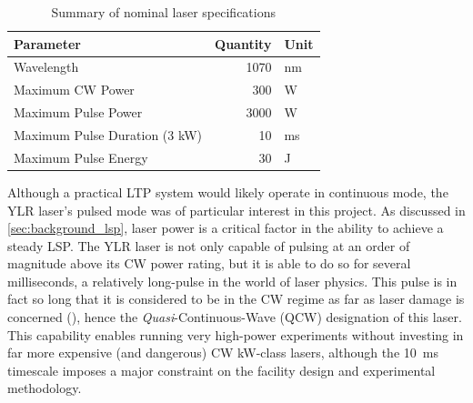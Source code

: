             \begin{table}[h]
                \centering
                \caption{Summary of nominal laser specifications}
                \label{tab:laser_spec}
                \begin{tabular}{@{}lrl@{}}
                    \toprule
                    Parameter            & Quantity & Unit \\ \midrule
                    Wavelength                    & 1070              & nm            \\
                    Maximum CW Power              & 300               & W             \\
                    Maximum Pulse Power           & 3000              & W             \\
                    Maximum Pulse Duration (3 kW) & 10                & ms            \\
                    Maximum Pulse Energy          & 30              & J             \\ \bottomrule
                    \end{tabular}
            \end{table}

            Although a practical LTP system would likely operate in continuous mode, the YLR laser's pulsed mode was of particular interest in this project. As discussed in \autoref{sec:background_lsp}, laser power is a critical factor in the ability to achieve a steady LSP. The YLR laser is not only capable of pulsing at an order of magnitude above its CW power rating, but it is able to do so for several milliseconds, a relatively long-pulse in the world of laser physics. This pulse is in fact so long that it is considered to be in the CW regime as far as laser damage is concerned (\textcite{thorlabsNBK7PlanoConvexLenses}), hence the \emph{Quasi}-Continuous-Wave (QCW) designation of this laser. This capability enables running very high-power experiments without investing in far more expensive (and dangerous) CW kW-class lasers, although the 10~ms timescale imposes a major constraint on the facility design and experimental methodology.


